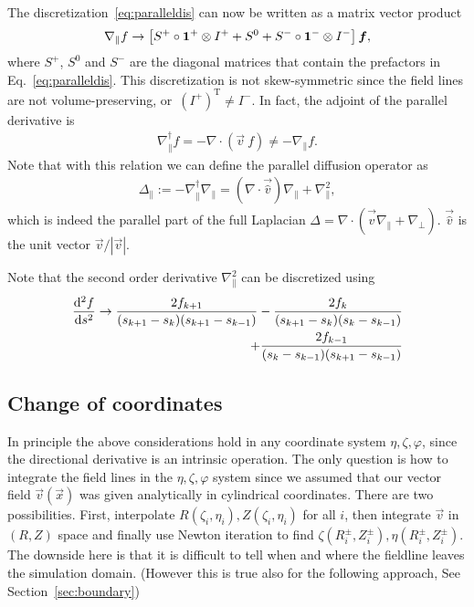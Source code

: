 The discretization~\eqref{eq:paralleldis} can now be written as a matrix vector product
\begin{align}
\nabla_\parallel f \rightarrow  \left[S^+ \circ \mathbf{1}^+\otimes I^+ + S^0  + S^-\circ \mathbf{1}^- \otimes I^-  \right] {\boldsymbol{f}},
    \label{}
\end{align}
where $S^+$, $S^0$ and $S^-$ are the diagonal matrices that contain the prefactors
in Eq.~\eqref{eq:paralleldis}.
This discretization is not skew-symmetric since the
field lines are not volume-preserving, or~$(I^+)^\mathrm{T} \neq I^-$.
In fact, the adjoint of the parallel derivative is
\begin{align}
    \nabla_\parallel^\dagger f = - \nabla\cdot(\vec v\ f ) \neq -\nabla_\parallel f.
    \label{}
\end{align}
Note that with this relation we can define the parallel
diffusion operator as
\begin{align}
    \Delta_\parallel := -\nabla_\parallel^\dagger \nabla_\parallel = (\nabla\cdot \vec{ \hat v}) \nabla_\parallel + \nabla_\parallel^2 , 
    \label{}
\end{align}
which is indeed the parallel part of the full Laplacian $\Delta = \nabla\cdot( \vec{ \hat v} \nabla_\parallel + \nabla_\perp)$.
$\vec{ \hat v} $ is the unit vector $\vec v/ |\vec v|$.

Note that the second order derivative $\nabla_\parallel^2$ can be
discretized using
\begin{align}\label{eq:second_order}
    \frac{\mathrm{d}^2 f}{\mathrm{d} s^2} \rightarrow
     \frac{2f_{k+1}}{(s_{k+1}-s_k)(s_{k+1}-s_{k-1})}
    -\frac{2f_{k}}{(s_{k+1}-s_k)(s_{k}-s_{k-1})} \nonumber\\
    +\frac{2f_{k-1}}{(s_{k}-s_{k-1})(s_{k+1}-s_{k-1})}
\end{align}

\subsection{Change of coordinates}
In principle the above considerations hold in any
coordinate system $\eta,\zeta,\varphi$, since the directional derivative is
an intrinsic operation.
The only question is how to integrate the field lines in the
$\eta, \zeta,\varphi$ system
since we assumed that our vector field $\vec v(\vec x)$ was given
analytically in
cylindrical coordinates. There are two possibilities.
First, interpolate $R(\zeta_i, \eta_i), Z(\zeta_i, \eta_i)$ for
all $i$, then integrate $\vec v$ in $(R,Z)$ space and finally use
Newton iteration to find $\zeta(R^\pm_i, Z^\pm_i), \eta(R^\pm_i, Z^\pm_i)$.
The downside here is that it is difficult to tell when and where the fieldline leaves the simulation domain. (However this is true also for the
following approach, See Section~\ref{sec:boundary})

